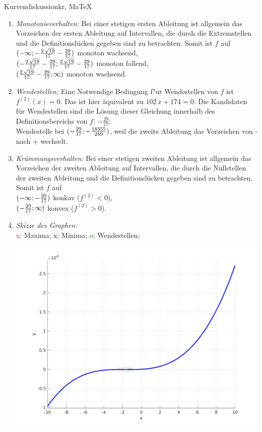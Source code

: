 \begin{MAufgabe}{Kurvendiskussion}{kr, MaTeX}
\begin{enumerate}
 \item \emph{Monotonieverhalten:} 
 Bei einer stetigen ersten Ableitung ist allgemein das Vorzeichen der ersten Ableitung auf Intervallen, die durch die Extremstellen und die Definitionsl\"ucken gegeben sind zu betrachten. Somit ist $f$ auf \\ 
 $(-\infty; - \frac{2\, \sqrt{19}}{17} - \frac{29}{17})$ monoton wachsend, \\ 
 $( - \frac{2\, \sqrt{19}}{17} - \frac{29}{17};\frac{2\, \sqrt{19}}{17} - \frac{29}{17})$ monoton  fallend, \\ 
 $(\frac{2\, \sqrt{19}}{17} - \frac{29}{17}; \infty)$ monoton wachsend. \\ 
 \item \emph{Wendestellen:} 
 Eine Notwendige Bedingung f"ur Wendestellen von $f$ ist $f^{(2)}(x)=0$. 
 Das ist hier \"aquivalent zu $102\, x + 174=0$. 
 Die Kandidaten f\"ur Wendestellen sind die L\"osung dieser Gleichung innerhalb des Definitionsbereichs von $f$: $- \frac{29}{17}$; \\ 
 Wendestelle bei $(- \frac{29}{17};- \frac{18355}{289})$, weil die zweite Ableitung das Vorzeichen von - nach + wechselt. \\ 
 \item \emph{Kr\"ummungsverhalten:} 
 Bei einer stetigen zweiten Ableitung ist allgemein das Vorzeichen der zweiten Ableitung auf Intervallen, die durch die Nullstellen der zweiten Ableitung und die Definitionsl\"ucken gegeben sind zu betrachten. 
 Somit ist $f$ auf \\ 
 $(-\infty ;- \frac{29}{17})$  konkav ($f^{(2)}<0$), \\ 
 $(- \frac{29}{17}; \infty)$  konvex ($f^{(2)}>0$). \\ 
 \item \emph{Skizze des Graphen:} \\ 
 {\textcolor{red} x}: Maxima; {\textcolor{black} x}: Minima; {\textcolor{green} o}: Wendestellen; 
  \begin{center}
  \includegraphics[width=0.8\linewidth]{Abb_zur_Ag_autogenerated_fractions_36.png} \end{center}
  
 \end{enumerate}
 \else\relax\fi
  \end{MAufgabe}